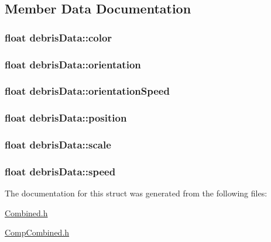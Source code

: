 \subsection{Member Data Documentation}
\hypertarget{structdebrisData_a780787eca7eef881b736db2190cc641e}{
\subsubsection[{color}]{\setlength{\rightskip}{0pt plus 5cm}float debris\-Data\-::color}}\label{structdebrisData_a780787eca7eef881b736db2190cc641e}
\hypertarget{structdebrisData_a5dde6042df51e675f7e1c0314742914f}{
\subsubsection[{orientation}]{\setlength{\rightskip}{0pt plus 5cm}float debris\-Data\-::orientation}}\label{structdebrisData_a5dde6042df51e675f7e1c0314742914f}
\hypertarget{structdebrisData_af8aedd6d89506857ad946bf9da4106fa}{
\subsubsection[{orientation\-Speed}]{\setlength{\rightskip}{0pt plus 5cm}float debris\-Data\-::orientation\-Speed}}\label{structdebrisData_af8aedd6d89506857ad946bf9da4106fa}
\hypertarget{structdebrisData_a83e759526fd3e37a970c37f11b3f8692}{
\subsubsection[{position}]{\setlength{\rightskip}{0pt plus 5cm}float debris\-Data\-::position}}\label{structdebrisData_a83e759526fd3e37a970c37f11b3f8692}
\hypertarget{structdebrisData_a1086fa18153e02ebe8b2514252befa02}{
\subsubsection[{scale}]{\setlength{\rightskip}{0pt plus 5cm}float debris\-Data\-::scale}}\label{structdebrisData_a1086fa18153e02ebe8b2514252befa02}
\hypertarget{structdebrisData_a979a15ead2fba9d83c4b9bc2c830c3ec}{
\subsubsection[{speed}]{\setlength{\rightskip}{0pt plus 5cm}float debris\-Data\-::speed}}\label{structdebrisData_a979a15ead2fba9d83c4b9bc2c830c3ec}


The documentation for this struct was generated from the following files\-:\begin{DoxyCompactItemize}
\item 
\hyperlink{Combined_8h}{Combined.\-h}\item 
\hyperlink{CompCombined_8h}{Comp\-Combined.\-h}\end{DoxyCompactItemize}
